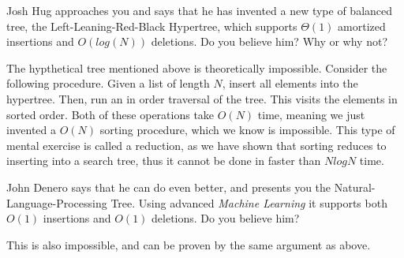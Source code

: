 \begin{blocksection}
\begin{parts}
\item Josh Hug approaches you and says that he has invented a new type of balanced tree, the Left-Leaning-Red-Black Hypertree, which supports $\Theta(1)$ amortized insertions and $O(log(N))$ deletions. Do you believe him? Why or why not?

\begin{solution}[2in]
The hypthetical tree mentioned above is theoretically impossible. Consider the following procedure. Given a list of length $N$, insert all elements into the hypertree. Then, run an in order traversal of the tree. This visits the elements in sorted order. Both of these operations take $O(N)$ time, meaning we just invented a $O(N)$ sorting procedure, which we know is impossible. This type of mental exercise is called a reduction, as we have shown that sorting reduces to inserting into a search tree, thus it cannot be done in faster than $NlogN$ time.
\end{solution}

\item John Denero says that he can do even better, and presents you the Natural-Language-Processing Tree. Using advanced \textit{Machine Learning} it supports both $O(1)$ insertions and $O(1)$ deletions. Do you believe him?

\begin{solution}[2in]
This is also impossible, and can be proven by the same argument as above.
\end{solution}
\end{parts}
\end{blocksection}